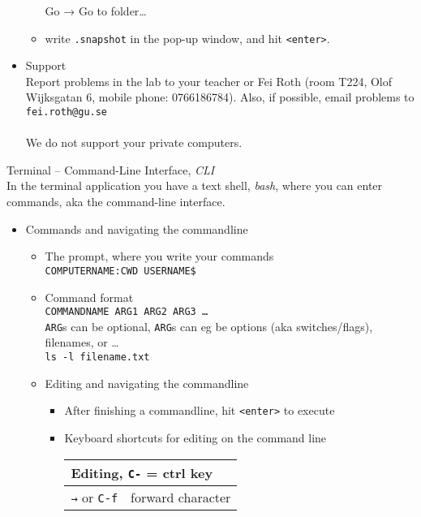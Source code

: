 \documentclass[a4,landscape]{seminar}
\begin{document}
\begin{slide}
\begin{itemize}
\begin{itemize}
      Go → Go to folder\dots
    \item write \texttt{.snapshot} in the pop-up window, and hit \texttt{<enter>}.
    \end{itemize}
    \clearpage{}
  \item Support\\[1ex]
    Report problems in the lab to your teacher or Fei Roth (room T224,
    Olof Wijksgatan 6, mobile phone: 0766186784). Also, if possible, email problems to\\[1ex]
    \texttt{fei.roth@gu.se}\\\\
    We do not support your private computers.
  \end{itemize}
\end{slide}
\begin{slide} 
  {\Large Terminal -- Command-Line Interface, \emph{CLI}}\\[1ex]
  In the terminal application you have a text shell, \emph{bash}, where you
  can enter commands, aka the command-line interface.
  \begin{itemize}
  \item Commands and navigating the commandline
    \begin{itemize}
    \item The prompt, where you write your commands\\[1ex]
      \texttt{COMPUTERNAME:CWD USERNAME\$}
    \item Command format\\[1ex]
      \texttt{COMMANDNAME ARG1 ARG2 ARG3 \dots}\\[1ex]
      \texttt{ARG}s can be optional, \texttt{ARG}s can eg be options
      (aka switches/flags), filenames, or \dots\\[1ex]
      \texttt{ls -l filename.txt}
      \clearpage{}
    \item Editing and navigating the commandline
      \begin{itemize}
      \item After finishing a commandline, hit \texttt{<enter>} to execute
      \item Keyboard shortcuts for editing on the command line\\[1ex]
        \begin{tabular}{|r|l|}
          \hline
          \multicolumn{2}{|l|}{Editing, \texttt{C-} = ctrl key }\\\hline\hline
          \texttt{→} or \texttt{C-f} & forward character\\

\end{tabular}
\end{itemize}
\end{itemize}
\end{itemize}
\end{slide}
\end{document}
